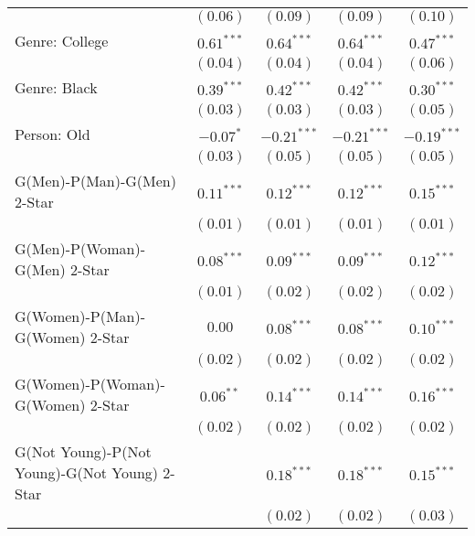 \begin{center}
\begin{longtable}{l c c c c}
                                              & $(0.06)$      & $(0.09)$      & $(0.09)$      & $(0.10)$      \\
Genre: College                                & $0.61^{***}$  & $0.64^{***}$  & $0.64^{***}$  & $0.47^{***}$  \\
                                              & $(0.04)$      & $(0.04)$      & $(0.04)$      & $(0.06)$      \\
Genre: Black                                  & $0.39^{***}$  & $0.42^{***}$  & $0.42^{***}$  & $0.30^{***}$  \\
                                              & $(0.03)$      & $(0.03)$      & $(0.03)$      & $(0.05)$      \\
Person: Old                                   & $-0.07^{*}$   & $-0.21^{***}$ & $-0.21^{***}$ & $-0.19^{***}$ \\
                                              & $(0.03)$      & $(0.05)$      & $(0.05)$      & $(0.05)$      \\
G(Men)-P(Man)-G(Men) 2-Star                   & $0.11^{***}$  & $0.12^{***}$  & $0.12^{***}$  & $0.15^{***}$  \\
                                              & $(0.01)$      & $(0.01)$      & $(0.01)$      & $(0.01)$      \\
G(Men)-P(Woman)-G(Men) 2-Star                 & $0.08^{***}$  & $0.09^{***}$  & $0.09^{***}$  & $0.12^{***}$  \\
                                              & $(0.01)$      & $(0.02)$      & $(0.02)$      & $(0.02)$      \\
G(Women)-P(Man)-G(Women) 2-Star               & $0.00$        & $0.08^{***}$  & $0.08^{***}$  & $0.10^{***}$  \\
                                              & $(0.02)$      & $(0.02)$      & $(0.02)$      & $(0.02)$      \\
G(Women)-P(Woman)-G(Women) 2-Star             & $0.06^{**}$   & $0.14^{***}$  & $0.14^{***}$  & $0.16^{***}$  \\
                                              & $(0.02)$      & $(0.02)$      & $(0.02)$      & $(0.02)$      \\
G(Not Young)-P(Not Young)-G(Not Young) 2-Star &               & $0.18^{***}$  & $0.18^{***}$  & $0.15^{***}$  \\
                                              &               & $(0.02)$      & $(0.02)$      & $(0.03)$      \\

\end{longtable}
\end{center}
